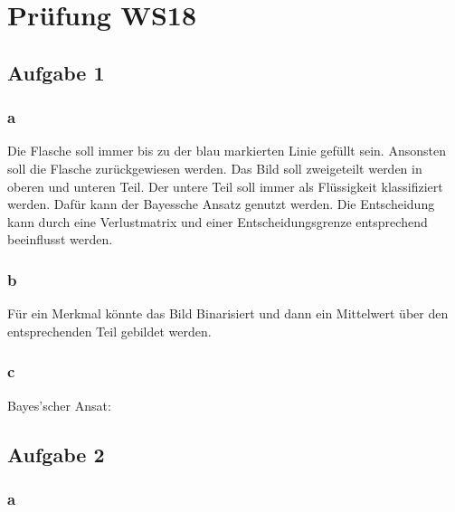 \documentclass{article}
\begin{document}
\section{Prüfung WS18}

\subsection{Aufgabe 1}

	\subsubsection{a}
	Die Flasche soll immer bis zu der blau markierten Linie gefüllt sein. Ansonsten soll die Flasche zurückgewiesen werden. Das Bild soll zweigeteilt werden in oberen und unteren Teil. Der untere Teil soll immer als Flüssigkeit klassifiziert werden. Dafür kann der Bayessche Ansatz genutzt werden. Die Entscheidung kann durch eine Verlustmatrix und einer Entscheidungsgrenze entsprechend beeinflusst werden.
	
	\subsubsection{b}
	
	Für ein Merkmal könnte das Bild Binarisiert und dann ein Mittelwert über den entsprechenden Teil gebildet werden.

	\subsubsection{c}
	Bayes'scher Ansat: 

\subsection{Aufgabe 2}
	\subsubsection{a}
		\begin{figure}[h]
		\end{figure}
\end{document}
